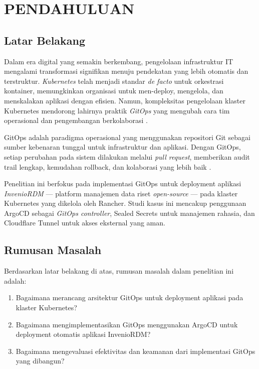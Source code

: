 \chapter{PENDAHULUAN}

\section{Latar Belakang}

Dalam era digital yang semakin berkembang, pengelolaan infrastruktur IT mengalami transformasi signifikan menuju pendekatan yang lebih otomatis dan terstruktur. \textit{Kubernetes} telah menjadi standar \textit{de facto} untuk orkestrasi kontainer, memungkinkan organisasi untuk men-deploy, mengelola, dan menskalakan aplikasi dengan efisien. Namun, kompleksitas pengelolaan klaster Kubernetes mendorong lahirnya praktik \textit{GitOps} yang mengubah cara tim operasional dan pengembangan berkolaborasi \citep{weaveworks-gitops}.

GitOps adalah paradigma operasional yang menggunakan repositori Git sebagai sumber kebenaran tunggal untuk infrastruktur dan aplikasi. Dengan GitOps, setiap perubahan pada sistem dilakukan melalui \textit{pull request}, memberikan audit trail lengkap, kemudahan rollback, dan kolaborasi yang lebih baik \citep{gitops-principles}.

Penelitian ini berfokus pada implementasi GitOps untuk deployment aplikasi \textit{InvenioRDM} --- platform manajemen data riset \textit{open-source} --- pada klaster Kubernetes yang dikelola oleh Rancher. Studi kasus ini mencakup penggunaan ArgoCD sebagai \textit{GitOps controller}, Sealed Secrets untuk manajemen rahasia, dan Cloudflare Tunnel untuk akses eksternal yang aman.

\section{Rumusan Masalah}

Berdasarkan latar belakang di atas, rumusan masalah dalam penelitian ini adalah:

\begin{enumerate}
  \item Bagaimana merancang arsitektur GitOps untuk deployment aplikasi pada klaster Kubernetes?
  \item Bagaimana mengimplementasikan GitOps menggunakan ArgoCD untuk deployment otomatis aplikasi InvenioRDM?
  \item Bagaimana mengevaluasi efektivitas dan keamanan dari implementasi GitOps yang dibangun?
\end{enumerate}

